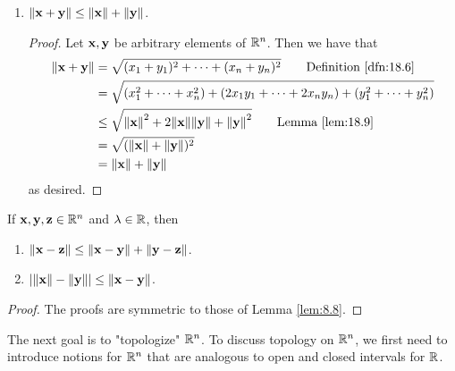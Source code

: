 \documentclass[../main.tex]{subfiles}
\begin{document}
\begin{theorem}
\begin{enumerate}[label=\textup{(}\alph*\textup{)},ref={\thetheorem\alph*}]
\begin{proof}
            Let $\lambda$ be an arbitrary element of $\R$, and let $\x$ be an arbitrary element of $\R^n$. Then we have that
            \begin{align*}
                \norm{\lambda\x} &= \sqrt{(\lambda x_1)^2+\cdots+(\lambda x_n)^2}\tag*{Definition \ref{dfn:18.6}}\\
                &= |\lambda|\cdot\sqrt{x_1^2+\cdots+x_n^2}\\
                &= |\lambda|\cdot\norm{\x}\tag*{Definition \ref{dfn:18.6}}
            \end{align*}
            as desired.
        \end{proof}
        \item \label{trm:18.10c}$\norm{\mathbf{x}+\mathbf{y}}\leq\norm{\mathbf{x}}+\norm{\mathbf{y}}$.
        \begin{proof}
            Let $\mathbf{x},\mathbf{y}$ be arbitrary elements of $\R^n$. Then we have that
            \begin{align*}
                \norm{\x+\y} &= \sqrt{(x_1+y_1)^2+\cdots+(x_n+y_n)^2}\tag*{Definition \ref{dfn:18.6}}\\
                &= \sqrt{(x_1^2+\cdots+x_n^2)+(2x_1y_1+\cdots+2x_ny_n)+(y_1^2+\cdots+y_n^2)}\\
                &\leq \sqrt{\norm{\x}^2+2\norm{\x}\norm{\y}+\norm{\y}^2}\tag*{Lemma \ref{lem:18.9}}\\
                &= \sqrt{(\norm{\x}+\norm{\y})^2}\\
                &= \norm{\x}+\norm{\y}
            \end{align*}
            as desired.
        \end{proof}
    \end{enumerate}
\end{theorem}

\begin{corollary}\label{cly:18.11}
    If $\mathbf{x},\mathbf{y},\mathbf{z}\in\mathbb{R}^n$ and $\lambda\in\mathbb{R}$, then
    \begin{enumerate}[label=\textup{(}\alph*\textup{)}]
        \item $\norm{\mathbf{x}-\mathbf{z}}\leq\norm{\mathbf{x}-\mathbf{y}}+\norm{\mathbf{y}-\mathbf{z}}$.
        \item $|\norm{\mathbf{x}}-\norm{\mathbf{y}}|\leq\norm{\mathbf{x}-\mathbf{y}}$.
    \end{enumerate}
    \begin{proof}
        The proofs are symmetric to those of Lemma \ref{lem:8.8}.
    \end{proof}
\end{corollary}

The next goal is to "topologize" $\R^n$. To discuss topology on $\R^n$, we first need to introduce notions for $\R^n$ that are analogous to open and closed intervals for $\R$.
\end{document}
